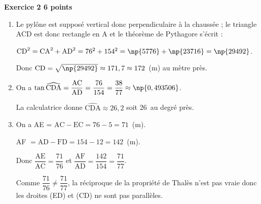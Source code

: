 \textbf{Exercice 2 \hfill 6 points}

\medskip

%
%
%
%
%

\begin{enumerate}
\item %
Le pylône est supposé vertical donc perpendiculaire à la chaussée ; le triangle ACD est donc rectangle en A et le théorème de Pythagore s'écrit :

$\text{CD}^2 = \text{CA}^2 + \text{AD}^2 = 76^2 + 154^2 = \np{5776} + \np{23716} = \np{29492}$.

Donc $\text{CD} = \sqrt{\np{29492}} \approx 171,7 \approx 172$~(m) au mètre près.
\item %

On a $\tan \widehat{\text{CDA}} = \dfrac{\text{AC}}{\text{AD}} = \dfrac{76}{154} = \dfrac{38}{77} \approx \np{0,493506}$.

La calculatrice donne $\widehat{\text{CDA}} \approx 26,2$ soit 26\,\degres{} au degré près.
\item %
On a AE = $\text{AC} - \text{EC} = 76 - 5 = 71$~(m).

AF $ = \text{AD} - \text{FD} = 154 - 12 = 142$~(m).

Donc $\dfrac{\text{AE}}{\text{AC}} = \dfrac{71}{76}$ et $\dfrac{\text{AF}}{\text{AD}} = \dfrac{142}{154} = \dfrac{71}{77}$.

Comme $\dfrac{71}{76} \ne \dfrac{71}{77}$, la réciproque de la propriété de Thalès n'est pas vraie donc les droites (ED) et (CD) ne sont pas parallèles.
\end{enumerate}

\bigskip

